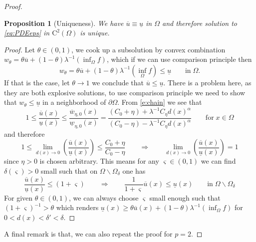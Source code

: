 \documentclass[11pt,reqno]{amsart}
\numberwithin{figure}{section}
\theoremstyle{plain}
\newtheorem{prop}[thm]{Proposition}
\theoremstyle{remark}
\numberwithin{equation}{section}
\begin{document}
\begin{proof}
\begin{prop}[Uniqueness] We have $\overline{u}\equiv \underline{u}$ in $\Omega$ and therefore solution to \eqref{eq:PDEeps} in $\mathrm{C}^2(\Omega)$ is unique.
\end{prop}
\begin{proof} Let $\theta\in (0,1)$, we cook up a subsolution by convex combination $w_\theta = \theta \overline{u} + (1-\theta)\lambda^{-1}\left(\inf_{\Omega} f\right)$, which if we can use comparison principle then
\begin{equation*}
    w_\theta = \theta \overline{u} + (1-\theta)\lambda^{-1}\left(\inf_{\Omega} f\right) \leq \underline{u} \qquad\text{in}\;\Omega.
\end{equation*}
If that is the case, let $\theta\to 1$ we conclude that $\overline{u} \leq \underline{u}$. There is a problem here, as they are both explosive solutions, to use comparison principle we need to show that $w_\theta \leq \underline{u}$ in a neighborhood of $\partial\Omega$. From \eqref{e:chain} we see that
\begin{equation*}
    1\leq \frac{\overline{u}(x)}{\underline{u}(x)} \leq \frac{\overline{w}_{\eta,0}(x)}{\underline{w}_{\eta,0}(x)} = \frac{(C_0+\eta)+\lambda^{-1}C_\eta d(x)^\alpha}{(C_0-\eta)-\lambda^{-1}C_\eta d(x)^\alpha} \qquad\text{for}\;x\in \Omega
\end{equation*}
and therefore
\begin{equation*}
   1\leq  \lim_{d(x)\to 0} \left(\frac{\overline{u}(x)}{\underline{u}(x)}\right) \leq \frac{C_0+\eta}{C_0-\eta} \qquad\Longrightarrow\qquad  \lim_{d(x)\to 0} \left(\frac{\overline{u}(x)}{\underline{u}(x)}\right) = 1
\end{equation*}
since $\eta>0$ is chosen arbitrary. This means for any $\varsigma\in(0,1)$ we can find $\delta(\varsigma)>0$ small such that on $\Omega\backslash \Omega_\delta$ one has
\begin{equation*}
\frac{\overline{u}(x)}{\underline{u}(x)}\leq (1+\varsigma)     \qquad\Longrightarrow\qquad \frac{1}{1+\varsigma} \overline{u}(x) \leq \underline{u}(x) \qquad\text{in}\; \Omega\backslash \Omega_\delta
\end{equation*}
For given $\theta\in (0,1)$, we can always choose $\varsigma$ small enough such that $(1+\varsigma)^{-1} > \theta$ which renders $\underline{u}(x) \geq \theta \overline{u}(x) + (1-\theta)\lambda^{-1}\left(\inf_\Omega f\right)$ for $0< d(x) < \delta' < \delta$.
\end{proof}
\noindent A final remark is that, we can also repeat the proof for $p=2$.
\end{proof}
\end{document}
